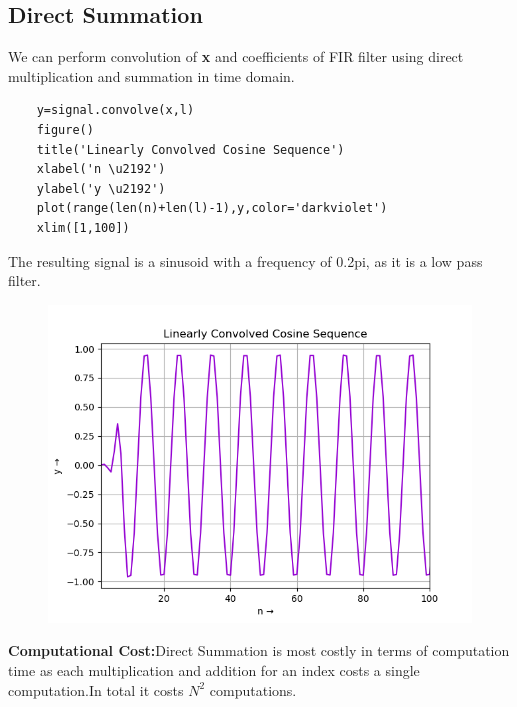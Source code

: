 \documentclass[11pt, a4paper]{article}
\begin{document}
\subsection{Direct Summation}
We can perform convolution of \textbf{x} and coefficients of FIR filter using direct multiplication and summation in time domain.
\begin{verbatim}
    y=signal.convolve(x,l)
    figure()
    title('Linearly Convolved Cosine Sequence')
    xlabel('n \u2192')
    ylabel('y \u2192')
    plot(range(len(n)+len(l)-1),y,color='darkviolet')
    xlim([1,100])
\end{verbatim}
The resulting signal is a sinusoid with a frequency of 0.2pi, as it is a low pass filter.
\begin{figure}[H]
   	\centering
   	\includegraphics[scale=0.5]{Figure_3.png}
\end{figure}
\textbf{Computational Cost:}Direct Summation is most costly in terms of computation time as each multiplication and addition for an index costs a single computation.In total it costs $N^2$ computations.
\end{document}
